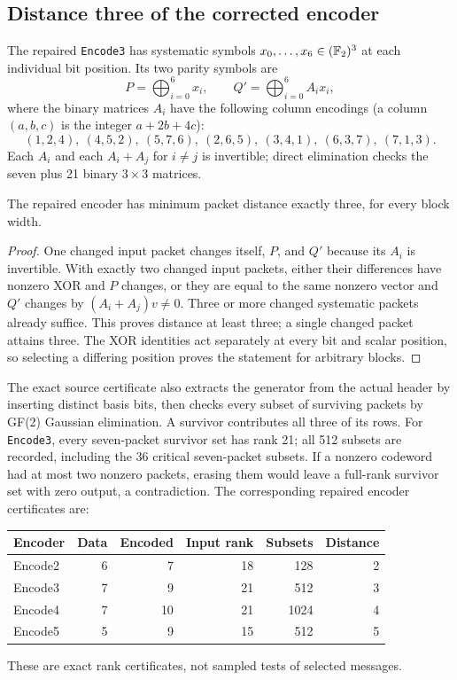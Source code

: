 \subsection{Distance three of the corrected encoder}
The repaired \texttt{Encode3} has systematic symbols $x_0,\ldots,x_6\in(\mathbb F_2)^3$ at each individual bit position. Its two parity symbols are
\[
 P=\bigoplus_{i=0}^6x_i,\qquad Q'=\bigoplus_{i=0}^6A_ix_i,
\]
where the binary matrices $A_i$ have the following column encodings (a column $(a,b,c)$ is the integer $a+2b+4c$):
\begin{equation}\label{eq:encoder}
 (1,2,4),\ (4,5,2),\ (5,7,6),\ (2,6,5),\ (3,4,1),\ (6,3,7),\ (7,1,3).
\end{equation}
Each $A_i$ and each $A_i+A_j$ for $i\ne j$ is invertible; direct elimination checks the seven plus 21 binary $3\times3$ matrices.

\begin{lemma}\label{lem:distance}
The repaired encoder has minimum packet distance exactly three, for every block width.
\end{lemma}
\begin{proof}
One changed input packet changes itself, $P$, and $Q'$ because its $A_i$ is invertible. With exactly two changed input packets, either their differences have nonzero XOR and $P$ changes, or they are equal to the same nonzero vector and $Q'$ changes by $(A_i+A_j)v\ne0$. Three or more changed systematic packets already suffice. This proves distance at least three; a single changed packet attains three. The XOR identities act separately at every bit and scalar position, so selecting a differing position proves the statement for arbitrary blocks.
\end{proof}

The exact source certificate also extracts the generator from the actual header by inserting distinct basis bits, then checks every subset of surviving packets by GF(2) Gaussian elimination. A survivor contributes all three of its rows. For \texttt{Encode3}, every seven-packet survivor set has rank 21; all 512 subsets are recorded, including the 36 critical seven-packet subsets. If a nonzero codeword had at most two nonzero packets, erasing them would leave a full-rank survivor set with zero output, a contradiction. The corresponding repaired encoder certificates are:
\begin{center}
\begin{tabular}{@{}lrrrrr@{}}\toprule
Encoder&Data&Encoded&Input rank&Subsets&Distance\\\midrule
Encode2&6&7&18&128&2\\
Encode3&7&9&21&512&3\\
Encode4&7&10&21&1024&4\\
Encode5&5&9&15&512&5\\\bottomrule
\end{tabular}
\end{center}
These are exact rank certificates, not sampled tests of selected messages.

